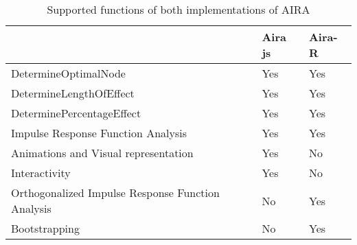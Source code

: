 \begin{table}[ht]
\centering
\begin{tabular}{lll}
  \toprule
 & Aira js & Aira-R \\ 
  \midrule
DetermineOptimalNode & Yes & Yes \\ 
  DetermineLengthOfEffect & Yes & Yes \\ 
  DeterminePercentageEffect & Yes & Yes \\ 
  Impulse Response Function Analysis & Yes & Yes \\ 
  Animations and Visual representation & Yes & No \\ 
  Interactivity & Yes & No \\ 
  Orthogonalized Impulse Response Function Analysis & No & Yes \\ 
  Bootstrapping & No & Yes \\ 
   \bottomrule
\end{tabular}
\caption{Supported functions of both implementations of AIRA} 
\label{tab:supported_functions}
\end{table}
